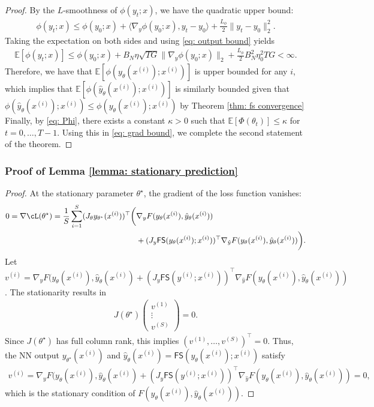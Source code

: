 \documentclass{article}
\def\E{\mathbb{E}}
\def\FS{\mathsf{FS}}
\def\x{x}
\def\y{y_{\theta}}   \def\hy{\hat{y}_{\theta}}    \def\ty{\Tilde{y}}
\def\i{{(i)}}
\begin{document}
\begin{proof}
By the $L$-smoothness of $\phi(y_t; \x)$, we have the quadratic upper bound:
\begin{align*}
    \phi(y_t;\x) \leq \phi(y_0;\x) + \langle \nabla_y \phi(y_0; \x), y_t - y_0 \rangle + \frac{L_\phi}{2} \| y_t - y_0 \|^2_2.
\end{align*}
Taking the expectation on both sides and using \eqref{eq: output bound} yields
\begin{align*}
    \E [\phi(y_t;\x)] \leq \phi(y_0;\x) + B_N \eta \sqrt{TG} \| \nabla_y \phi(y_0; \x)\|_2  + \frac{L_{\phi}}{2} B^2_N \eta_0^2 TG < \infty.
\end{align*}
Therefore, we have that $\E[\phi(\y(\x^\i); \x^\i)]$ is upper bounded for any $i$, which implies that $\E[\phi(\hy(\x^\i); \x^\i)]$ is similarly bounded given that $\phi(\hy(\x^\i); \x^\i) \leq \phi(\y(\x^\i); \x^\i)$ by Theorem \ref{thm: fs convergence}
Finally, by \eqref{eq: Phi}, there exists a constant $\kappa >0$ such that $\E[\Phi(\theta_t)] \leq \kappa$ for $t=0, \dots, T-1$. 
Using this in \eqref{eq: grad bound}, we complete the second statement of the theorem. 
\end{proof}

\subsubsection{Proof of Lemma \ref{lemma: stationary prediction}}
\lemmaStationary*
\begin{proof}
    At the stationary parameter $\theta^\star$, the gradient of the loss function vanishes: 
    \begin{align*}
        0 =\nabla \cL(\theta^\star)
        = \frac{1}{S} \sum_{i=1}^S (J_\theta y_{\theta^\star}(x^\i))^\top  \bigg(& \nabla_y F(\y(\x^\i), \hy(\x^\i)) \\
        & + (J_y \FS(\y(\x^\i); \x^\i))^\top \nabla_{\hat{y}} F(\y(\x^\i), \hy(\x^\i)) \bigg).
    \end{align*}
    Let $v^\i = \nabla_y F(\y(\x^\i), \hy(\x^\i) + (J_y \FS(y^\i; \x^\i))^\top \nabla_{\hat{y}} F(\y(\x^\i), \hy(\x^\i))$. The stationarity results in
    \begin{align*}
        J(\theta^\star) \left( \begin{array}{c}
              v^{(1)}\\
             \vdots \\
             v^{(S)}
        \end{array} \right) = 0.
    \end{align*}
    Since $J(\theta^\star)$ has full column rank, this implies $(v^{(1)},\dots,v^{(S)})^\top = 0$. 
    Thus, the NN output $y_{\theta^\star}(x^\i)$ and $\hy(\x^\i) = \FS(\y(\x^\i); \x^\i)$ satisfy
    \begin{align*}
        v^\i = \nabla_y F(\y(\x^\i), \hy(\x^\i) + (J_y \FS(y^\i; \x^\i))^\top \nabla_{\hat{y}} F(\y(\x^\i), \hy(\x^\i)) = 0,
    \end{align*}
    which is the stationary condition of $F(\y(\x^\i),\hy(\x^\i))$. 
\end{proof}
\end{document}
